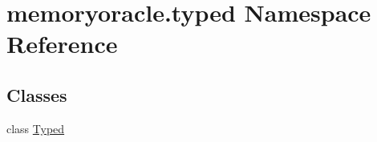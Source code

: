\hypertarget{namespacememoryoracle_1_1typed}{}\section{memoryoracle.\+typed Namespace Reference}
\label{namespacememoryoracle_1_1typed}
\subsection*{Classes}
\begin{DoxyCompactItemize}
\item 
class \hyperlink{classmemoryoracle_1_1typed_1_1Typed}{Typed}
\end{DoxyCompactItemize}
